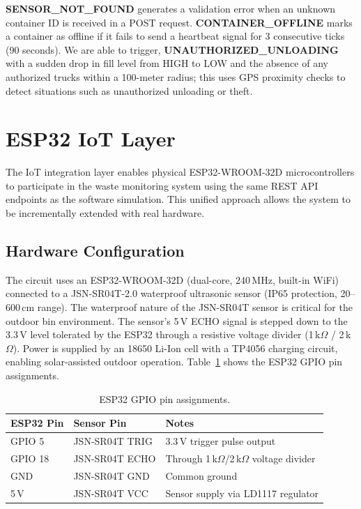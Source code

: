 \documentclass[12pt,a4paper]{report}
\begin{document}
\indent \textbf{SENSOR\_NOT\_FOUND} generates a validation error when an unknown container ID is received in a POST request. \textbf{CONTAINER\_OFFLINE} marks a container as offline if it fails to send a heartbeat signal for 3 consecutive ticks (90 seconds). We are able to trigger, \textbf{UNAUTHORIZED\_UNLOADING} with a sudden drop in fill level from HIGH to LOW and the absence of any authorized trucks within a 100-meter radius; this uses GPS proximity checks to detect situations such as unauthorized unloading or theft.

\section{ESP32 IoT Layer}

\indent The IoT integration layer enables physical ESP32-WROOM-32D microcontrollers to participate in the waste monitoring system using the same REST API endpoints as the software simulation. This unified approach allows the system to be incrementally extended with real hardware.

\subsection{Hardware Configuration}

\indent The circuit uses an ESP32-WROOM-32D (dual-core, 240\,MHz, built-in WiFi) connected to a JSN-SR04T-2.0 waterproof ultrasonic sensor (IP65 protection, 20--600\,cm range). The waterproof nature of the JSN-SR04T sensor is critical for the outdoor bin environment. The sensor's 5\,V ECHO signal is stepped down to the 3.3\,V level tolerated by the ESP32 through a resistive voltage divider (1\,k$\Omega$ / 2\,k$\Omega$). Power is supplied by an 18650 Li-Ion cell with a TP4056 charging circuit, enabling solar-assisted outdoor operation. Table~\ref{tab:gpio} shows the ESP32 GPIO pin assignments.

\begin{table}[H]
\centering
\caption{ESP32 GPIO pin assignments.}
\label{tab:gpio}
\begin{tabular}{lll}
\toprule
\textbf{ESP32 Pin} & \textbf{Sensor Pin} & \textbf{Notes} \\
\midrule
GPIO 5  & JSN-SR04T TRIG & 3.3\,V trigger pulse output \\
GPIO 18 & JSN-SR04T ECHO & Through 1\,k$\Omega$/2\,k$\Omega$ voltage divider \\
GND     & JSN-SR04T GND  & Common ground \\
5\,V    & JSN-SR04T VCC  & Sensor supply via LD1117 regulator \\
\bottomrule
\end{tabular}
\end{table}
\end{document}
